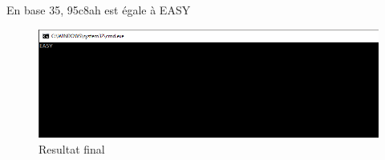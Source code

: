\documentclass[11pt]{report}
\begin{document}
\medskip

En base 35,  95c8ah est égale à EASY

\begin{figure}[ht]
\includegraphics[width=12cm]{Capture6.PNG}
\caption{Resultat final}
\end{figure}
\end{document}
